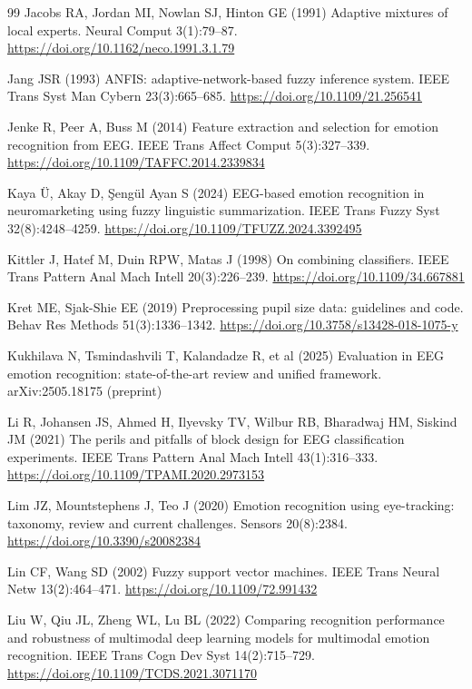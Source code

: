 \begin{thebibliography}{99}
 Jacobs RA, Jordan MI, Nowlan SJ, Hinton GE (1991) Adaptive mixtures of local experts. Neural Comput 3(1):79--87. \url{https://doi.org/10.1162/neco.1991.3.1.79}

 Jang JSR (1993) ANFIS: adaptive-network-based fuzzy inference system. IEEE Trans Syst Man Cybern 23(3):665--685. \url{https://doi.org/10.1109/21.256541}

 Jenke R, Peer A, Buss M (2014) Feature extraction and selection for emotion recognition from EEG. IEEE Trans Affect Comput 5(3):327--339. \url{https://doi.org/10.1109/TAFFC.2014.2339834}

 Kaya \"U, Akay D, \c{S}eng\"ul Ayan S (2024) EEG-based emotion recognition in neuromarketing using fuzzy linguistic summarization. IEEE Trans Fuzzy Syst 32(8):4248--4259. \url{https://doi.org/10.1109/TFUZZ.2024.3392495}

 Kittler J, Hatef M, Duin RPW, Matas J (1998) On combining classifiers. IEEE Trans Pattern Anal Mach Intell 20(3):226--239. \url{https://doi.org/10.1109/34.667881}

 Kret ME, Sjak-Shie EE (2019) Preprocessing pupil size data: guidelines and code. Behav Res Methods 51(3):1336--1342. \url{https://doi.org/10.3758/s13428-018-1075-y}

 Kukhilava N, Tsmindashvili T, Kalandadze R, et al (2025) Evaluation in EEG emotion recognition: state-of-the-art review and unified framework. arXiv:2505.18175 (preprint)

 Li R, Johansen JS, Ahmed H, Ilyevsky TV, Wilbur RB, Bharadwaj HM, Siskind JM (2021) The perils and pitfalls of block design for EEG classification experiments. IEEE Trans Pattern Anal Mach Intell 43(1):316--333. \url{https://doi.org/10.1109/TPAMI.2020.2973153}

 Lim JZ, Mountstephens J, Teo J (2020) Emotion recognition using eye-tracking: taxonomy, review and current challenges. Sensors 20(8):2384. \url{https://doi.org/10.3390/s20082384}

 Lin CF, Wang SD (2002) Fuzzy support vector machines. IEEE Trans Neural Netw 13(2):464--471. \url{https://doi.org/10.1109/72.991432}

 Liu W, Qiu JL, Zheng WL, Lu BL (2022) Comparing recognition performance and robustness of multimodal deep learning models for multimodal emotion recognition. IEEE Trans Cogn Dev Syst 14(2):715--729. \url{https://doi.org/10.1109/TCDS.2021.3071170}


\end{thebibliography}
